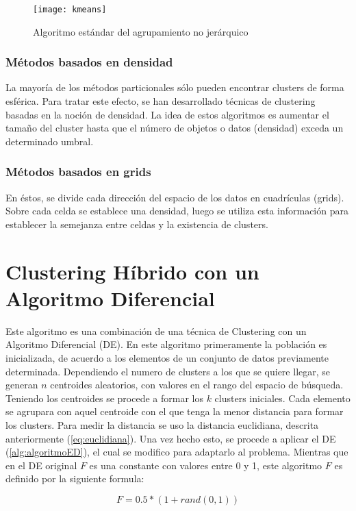 \documentclass[
]{article}
\begin{document}
\begin{figure}[h]
  \centering
    \texttt{[image: kmeans]}
  \caption{Algoritmo estándar del agrupamiento no jerárquico}
  \label{fig:nojerarquico}
\end{figure}

\subsubsection{Métodos basados en densidad}
La mayoría de los métodos particionales sólo pueden encontrar clusters de forma esférica. Para tratar este efecto, se han desarrollado técnicas de clustering basadas en la noción de densidad.
La idea de estos algoritmos es aumentar el tamaño del cluster hasta que el número de objetos o datos (densidad) exceda un determinado umbral.

\subsubsection{Métodos basados en grids}
En éstos, se divide cada dirección del espacio de los datos en cuadrículas (grids). Sobre cada celda se establece una densidad, luego se utiliza esta información para establecer la semejanza entre celdas y la existencia de clusters.

\newpage
\section{Clustering Híbrido con un Algoritmo Diferencial}
Este algoritmo es una combinación de una técnica de Clustering con un Algoritmo Diferencial (DE). En este algoritmo primeramente la población es inicializada, de acuerdo a los elementos de un conjunto de datos previamente determinada.
Dependiendo el numero de clusters a los que se quiere llegar, se generan $n$ centroides aleatorios, con valores en el rango del espacio de búsqueda. Teniendo los centroides se procede a formar los $k$ clusters iniciales. Cada elemento se agrupara con aquel centroide con el que tenga la menor distancia para formar los clusters. Para medir la distancia se uso la distancia euclidiana, descrita anteriormente (\ref{eq:euclidiana}).
Una vez hecho esto, se procede a aplicar el DE (\ref{alg:algoritmoED}), el cual se modifico para adaptarlo al problema. Mientras que en el DE original $F$ es una constante con valores entre 0 y 1, este algoritmo $F$ es definido por la siguiente formula:

\begin{equation}\label{eq:F}
F = 0.5*(1+rand(0,1))
\end{equation}
\end{document}
